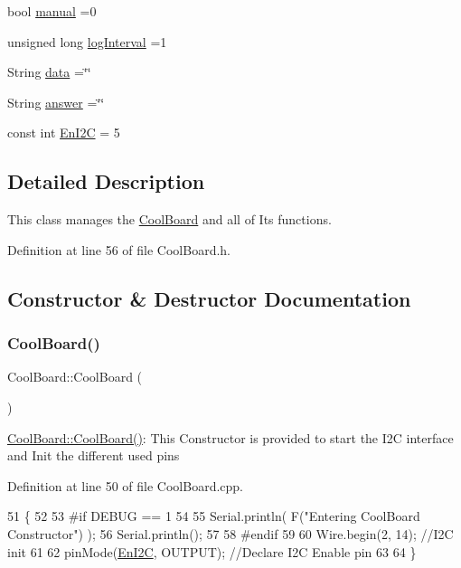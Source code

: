 \begin{DoxyCompactItemize}
\item 
bool \hyperlink{class_cool_board_a7c8e505a5804b109e112d5a03df6ea2b}{manual} =0
\item 
unsigned long \hyperlink{class_cool_board_a84bc94413b64973e4aba8c467c97006c}{log\+Interval} =1
\item 
String \hyperlink{class_cool_board_a427fb753dd8575bdf821c70a5c63d695}{data} =\char`\"{}\char`\"{}
\item 
String \hyperlink{class_cool_board_a7b835fafd449e5282f7f91d787a2dc15}{answer} =\char`\"{}\char`\"{}
\item 
const int \hyperlink{class_cool_board_af1fe1376fc66f93dee80b327ca695377}{En\+I2C} = 5
\end{DoxyCompactItemize}


\subsection{Detailed Description}
This class manages the \hyperlink{class_cool_board}{Cool\+Board} and all of Its functions. 

Definition at line 56 of file Cool\+Board.\+h.



\subsection{Constructor \& Destructor Documentation}
\mbox{\label{class_cool_board_a8b88fd781e22e93025dd63474113b7e4}} 
\subsubsection{\texorpdfstring{Cool\+Board()}{CoolBoard()}}
{\footnotesize\ttfamily Cool\+Board\+::\+Cool\+Board (\begin{DoxyParamCaption}{ }\end{DoxyParamCaption})}

\hyperlink{class_cool_board_a8b88fd781e22e93025dd63474113b7e4}{Cool\+Board\+::\+Cool\+Board()}\+: This Constructor is provided to start the I2C interface and Init the different used pins 

Definition at line 50 of file Cool\+Board.\+cpp.


\begin{DoxyCode}
51 \{
52 
53 \textcolor{preprocessor}{#if DEBUG == 1}
54 
55     Serial.println( F(\textcolor{stringliteral}{"Entering CoolBoard Constructor"}) );
56     Serial.println();
57 
58 \textcolor{preprocessor}{#endif}
59     
60     Wire.begin(2, 14);                       \textcolor{comment}{//I2C init }
61 
62     pinMode(\hyperlink{class_cool_board_af1fe1376fc66f93dee80b327ca695377}{EnI2C}, OUTPUT);           \textcolor{comment}{//Declare I2C Enable pin }
63 
64 \}
\end{DoxyCode}


